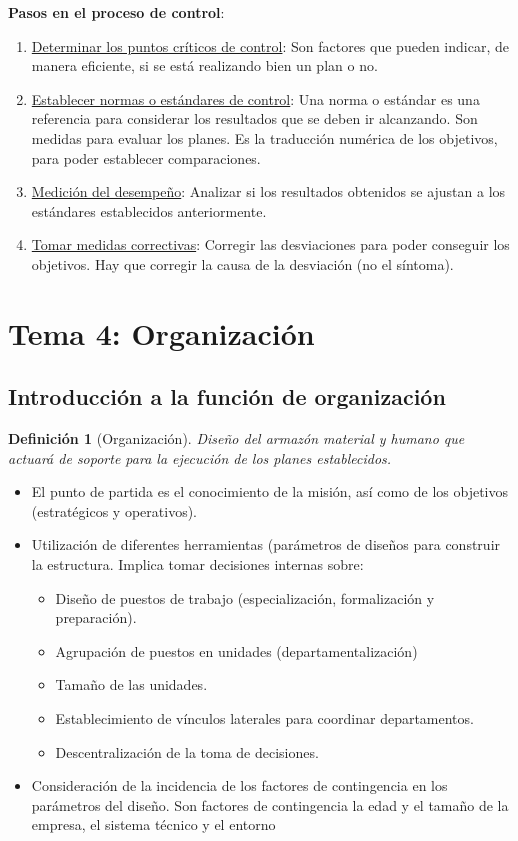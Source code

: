 \documentclass[12pt]{article}
\theoremstyle{definition_wo_parentheses}
\newtheorem{definicion}{Definición}[section]
\begin{document}
\textbf{Pasos en el proceso de control}:
\begin{enumerate}
\item \underline{Determinar los puntos críticos de control}: Son factores que pueden indicar, de manera eficiente, si se está realizando bien un plan o no.
\item \underline{Establecer normas o estándares de control}: Una norma o estándar es una referencia para considerar los resultados que se deben ir alcanzando. Son medidas para evaluar los planes. Es la traducción numérica de los objetivos, para poder establecer comparaciones.
\item \underline{Medición del desempeño}: Analizar si los resultados obtenidos  se ajustan a los estándares establecidos anteriormente.
\item \underline{Tomar medidas correctivas}: Corregir las desviaciones para poder conseguir los objetivos. Hay que corregir la causa de la desviación (no el síntoma).
\end{enumerate}


\section{Tema 4: Organización}

\subsection{Introducción a la función de organización}

\begin{definicion}[Organización]
	Diseño del armazón material y humano que actuará de soporte para la ejecución de los planes establecidos.
\end{definicion}

\begin{itemize}
\item El punto de partida es el conocimiento de la misión, así como de los objetivos (estratégicos y operativos).

\item Utilización de diferentes herramientas (parámetros de diseños para construir la estructura. Implica tomar decisiones internas sobre:

	\begin{itemize}
		\item Diseño de puestos de trabajo (especialización, formalización y preparación).
		\item Agrupación de puestos en unidades (departamentalización)
		\item Tamaño de las unidades.
		\item Establecimiento de vínculos laterales para coordinar departamentos.
		\item Descentralización de la toma de decisiones.
	\end{itemize}

\item Consideración de la incidencia de los factores de contingencia en los parámetros del diseño. Son factores de contingencia la edad y el tamaño de la empresa, el sistema técnico y el entorno
\end{itemize}
\end{document}
